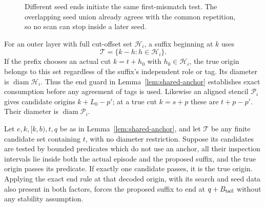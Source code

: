 \begin{figure}[t]
\centering
{}
\caption{Different seed ends initiate the same first-mismatch test.
The overlapping seed union already agrees with the common repetition,
so no scan can stop inside a later seed.}
\label{fig:common-seeds}
\end{figure}

For an outer layer with full cut-offset set $\mathcal H_i$, a suffix
beginning at $k$ uses
\[
 \mathcal T=\{k-h:h\in\mathcal H_i\}.
\]
If the prefix chooses an actual cut $k=t+h_0$ with
$h_0\in\mathcal H_i$, the true origin belongs to this set regardless of
the suffix's independent role or tag.  Its diameter is
$\operatorname{diam}\mathcal H_i$.  Thus the end guard in
Lemma~\ref{lem:shared-anchor} establishes exact consumption before any
agreement of tags is used.  Likewise an aligned stencil $\mathcal P_i$
gives candidate origins $k+L_0-p'$; at a true cut $k=s+p$ these are
$t+p-p'$.  Their diameter is $\operatorname{diam}\mathcal P_i$.

\begin{lemma}\label{lem:decoded-end}
Let $e,k,[k,b),t,q$ be as in Lemma~\ref{lem:shared-anchor}, and let
$\mathcal T$ be any finite candidate set containing $t$, with no diameter
restriction.  Suppose its candidates are tested by bounded predicates
which do not use an anchor, all their inspection intervals lie inside
both the actual episode and the proposed suffix, and the true origin
passes its predicate.  If exactly one candidate passes, it is the true
origin.  Applying the exact end rule at that decoded origin, with its
search and seed data also present in both factors, forces the proposed
suffix to end at $q+B_{\rm tail}$ without any stability assumption.
\end{lemma}

